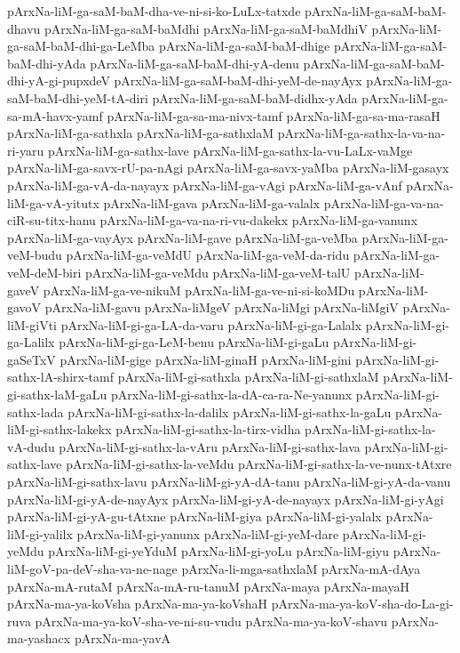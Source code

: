 {pArxNa-liM-ga-saM-baM-dha-ve-ni-si-ko-LuLx-tatxde
pArxNa-liM-ga-saM-baM-dhavu
pArxNa-liM-ga-saM-baMdhi
pArxNa-liM-ga-saM-baMdhiV
pArxNa-liM-ga-saM-baM-dhi-ga-LeMba
pArxNa-liM-ga-saM-baM-dhige
pArxNa-liM-ga-saM-baM-dhi-yAda
pArxNa-liM-ga-saM-baM-dhi-yA-denu
pArxNa-liM-ga-saM-baM-dhi-yA-gi-pupxdeV
pArxNa-liM-ga-saM-baM-dhi-yeM-de-nayAyx
pArxNa-liM-ga-saM-baM-dhi-yeM-tA-diri
pArxNa-liM-ga-saM-baM-didhx-yAda
pArxNa-liM-ga-sa-mA-havx-yamf
pArxNa-liM-ga-sa-ma-nivx-tamf
pArxNa-liM-ga-sa-ma-rasaH
pArxNa-liM-ga-sathxla
pArxNa-liM-ga-sathxlaM
pArxNa-liM-ga-sathx-la-va-na-ri-yaru
pArxNa-liM-ga-sathx-lave
pArxNa-liM-ga-sathx-la-vu-LaLx-vaMge
pArxNa-liM-ga-savx-rU-pa-nAgi
pArxNa-liM-ga-savx-yaMba
pArxNa-liM-gasayx
pArxNa-liM-ga-vA-da-nayayx
pArxNa-liM-ga-vAgi
pArxNa-liM-ga-vAnf
pArxNa-liM-ga-vA-yitutx
pArxNa-liM-gava
pArxNa-liM-ga-valalx
pArxNa-liM-ga-va-na-ciR-su-titx-hanu
pArxNa-liM-ga-va-na-ri-vu-dakekx
pArxNa-liM-ga-vanunx
pArxNa-liM-ga-vayAyx
pArxNa-liM-gave
pArxNa-liM-ga-veMba
pArxNa-liM-ga-veM-budu
pArxNa-liM-ga-veMdU
pArxNa-liM-ga-veM-da-ridu
pArxNa-liM-ga-veM-deM-biri
pArxNa-liM-ga-veMdu
pArxNa-liM-ga-veM-talU
pArxNa-liM-gaveV
pArxNa-liM-ga-ve-nikuM
pArxNa-liM-ga-ve-ni-si-koMDu
pArxNa-liM-gavoV
pArxNa-liM-gavu
pArxNa-liMgeV
pArxNa-liMgi
pArxNa-liMgiV
pArxNa-liM-giVti
pArxNa-liM-gi-ga-LA-da-varu
pArxNa-liM-gi-ga-Lalalx
pArxNa-liM-gi-ga-Lalilx
pArxNa-liM-gi-ga-LeM-benu
pArxNa-liM-gi-gaLu
pArxNa-liM-gi-gaSeTxV
pArxNa-liM-gige
pArxNa-liM-ginaH
pArxNa-liM-gini
pArxNa-liM-gi-sathx-lA-shirx-tamf
pArxNa-liM-gi-sathxla
pArxNa-liM-gi-sathxlaM
pArxNa-liM-gi-sathx-laM-gaLu
pArxNa-liM-gi-sathx-la-dA-ca-ra-Ne-yanunx
pArxNa-liM-gi-sathx-lada
pArxNa-liM-gi-sathx-la-dalilx
pArxNa-liM-gi-sathx-la-gaLu
pArxNa-liM-gi-sathx-lakekx
pArxNa-liM-gi-sathx-la-tirx-vidha
pArxNa-liM-gi-sathx-la-vA-dudu
pArxNa-liM-gi-sathx-la-vAru
pArxNa-liM-gi-sathx-lava
pArxNa-liM-gi-sathx-lave
pArxNa-liM-gi-sathx-la-veMdu
pArxNa-liM-gi-sathx-la-ve-nunx-tAtxre
pArxNa-liM-gi-sathx-lavu
pArxNa-liM-gi-yA-dA-tanu
pArxNa-liM-gi-yA-da-vanu
pArxNa-liM-gi-yA-de-nayAyx
pArxNa-liM-gi-yA-de-nayayx
pArxNa-liM-gi-yAgi
pArxNa-liM-gi-yA-gu-tAtxne
pArxNa-liM-giya
pArxNa-liM-gi-yalalx
pArxNa-liM-gi-yalilx
pArxNa-liM-gi-yanunx
pArxNa-liM-gi-yeM-dare
pArxNa-liM-gi-yeMdu
pArxNa-liM-gi-yeYduM
pArxNa-liM-gi-yoLu
pArxNa-liM-giyu
pArxNa-liM-goV-pa-deV-sha-va-ne-nage
pArxNa-li-mga-sathxlaM
pArxNa-mA-dAya
pArxNa-mA-rutaM
pArxNa-mA-ru-tanuM
pArxNa-maya
pArxNa-mayaH
pArxNa-ma-ya-koVsha
pArxNa-ma-ya-koVshaH
pArxNa-ma-ya-koV-sha-do-La-gi-ruva
pArxNa-ma-ya-koV-sha-ve-ni-su-vudu
pArxNa-ma-ya-koV-shavu
pArxNa-ma-yashacx
pArxNa-ma-yavA
}
